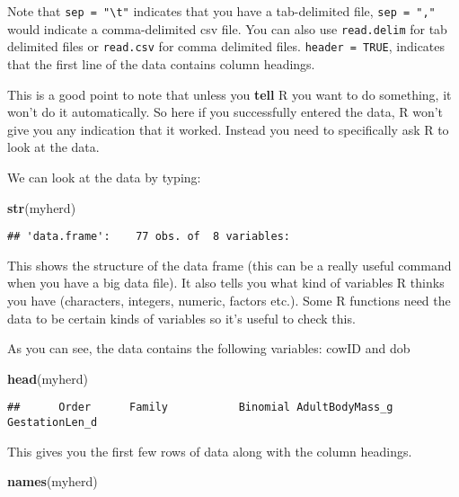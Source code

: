 \documentclass[12pt]{article}
\newcommand{\KeywordTok}[1]{\textcolor[rgb]{0.13,0.29,0.53}{\textbf{{#1}}}}
\newcommand{\NormalTok}[1]{{#1}}
\begin{document}
Note that \texttt{sep = "\textbackslash{}t"} indicates that you have a tab-delimited file, 
\texttt{sep = ","}  would indicate a comma-delimited csv file. You can also use
\texttt{read.delim} for tab delimited files or \texttt{read.csv} for comma delimited
files. \texttt{header = TRUE}, indicates that the first line of the data contains
column headings.

This is a good point to note that unless you \textbf{tell} R you want to
do something, it won't do it automatically. So here if you successfully
entered the data, R won't give you any indication that it worked.
Instead you need to specifically ask R to look at the data.

We can look at the data by typing:

\begin{snugshade}
\begin{Highlighting}[]
\KeywordTok{str}\NormalTok{(myherd)}
\end{Highlighting}
\end{snugshade}

\begin{verbatim}
## 'data.frame':    77 obs. of  8 variables:

\end{verbatim}

This shows the structure of the data frame (this can be a really useful
command when you have a big data file). It also tells you what kind of
variables R thinks you have (characters, integers, numeric, factors
etc.). Some R functions need the data to be certain kinds of variables
so it's useful to check this.

As you can see, the data contains the following variables: cowID and dob 

\begin{snugshade}
\begin{Highlighting}[]
\KeywordTok{head}\NormalTok{(myherd)}
\end{Highlighting}
\end{snugshade}

\begin{verbatim}
##      Order      Family           Binomial AdultBodyMass_g GestationLen_d

\end{verbatim}

This gives you the first few rows of data along with the column
headings.

\begin{snugshade}
\begin{Highlighting}[]
\KeywordTok{names}\NormalTok{(myherd)}
\end{Highlighting}
\end{snugshade}
\end{document}
